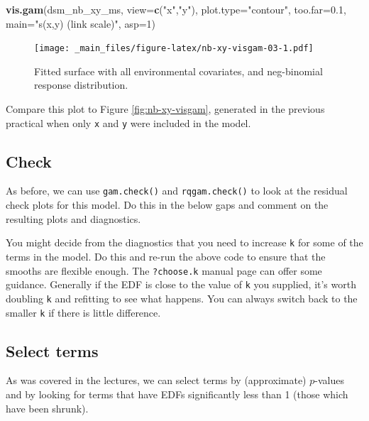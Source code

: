 \documentclass[]{book}
\newenvironment{Shaded}{\begin{snugshade}}{\end{snugshade}}
\newcommand{\KeywordTok}[1]{\textcolor[rgb]{0.13,0.29,0.53}{\textbf{#1}}}
\newcommand{\DataTypeTok}[1]{\textcolor[rgb]{0.13,0.29,0.53}{#1}}
\newcommand{\DecValTok}[1]{\textcolor[rgb]{0.00,0.00,0.81}{#1}}
\newcommand{\FloatTok}[1]{\textcolor[rgb]{0.00,0.00,0.81}{#1}}
\newcommand{\StringTok}[1]{\textcolor[rgb]{0.31,0.60,0.02}{#1}}
\newcommand{\NormalTok}[1]{#1}
\theoremstyle{definition}
\theoremstyle{definition}
\theoremstyle{remark}
\begin{document}
\begin{Shaded}
\begin{Highlighting}[]
\KeywordTok{vis.gam}\NormalTok{(dsm_nb_xy_ms, }\DataTypeTok{view=}\KeywordTok{c}\NormalTok{(}\StringTok{"x"}\NormalTok{,}\StringTok{"y"}\NormalTok{), }\DataTypeTok{plot.type=}\StringTok{"contour"}\NormalTok{, }\DataTypeTok{too.far=}\FloatTok{0.1}\NormalTok{, }
        \DataTypeTok{main=}\StringTok{"s(x,y) (link scale)"}\NormalTok{, }\DataTypeTok{asp=}\DecValTok{1}\NormalTok{)}
\end{Highlighting}
\end{Shaded}

\begin{figure}
\centering
\texttt{[image: \_main\_files/figure-latex/nb-xy-visgam-03-1.pdf]}
\caption{\label{fig:nb-xy-visgam-03}Fitted surface with all environmental
covariates, and neg-binomial response distribution.}
\end{figure}

Compare this plot to Figure \ref{fig:nb-xy-visgam}, generated in the
previous practical when only \texttt{x} and \texttt{y} were included in
the model.

\subsection{Check}\label{check}

As before, we can use \texttt{gam.check()} and \texttt{rqgam.check()} to
look at the residual check plots for this model. Do this in the below
gaps and comment on the resulting plots and diagnostics.

You might decide from the diagnostics that you need to increase
\texttt{k} for some of the terms in the model. Do this and re-run the
above code to ensure that the smooths are flexible enough. The
\texttt{?choose.k} manual page can offer some guidance. Generally if the
EDF is close to the value of \texttt{k} you supplied, it's worth
doubling \texttt{k} and refitting to see what happens. You can always
switch back to the smaller \texttt{k} if there is little difference.

\subsection{Select terms}\label{select-terms}

As was covered in the lectures, we can select terms by (approximate)
\(p\)-values and by looking for terms that have EDFs significantly less
than 1 (those which have been shrunk).
\end{document}
